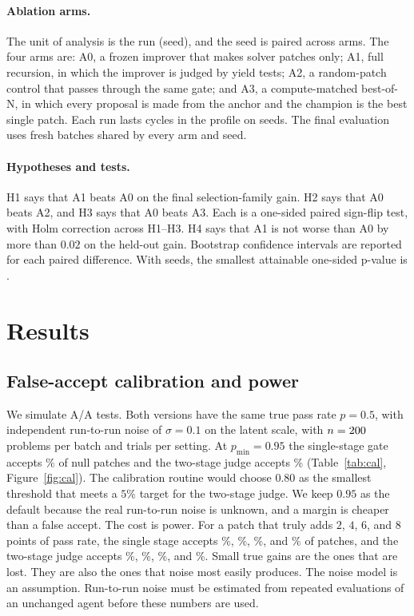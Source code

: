 \documentclass[11pt]{article}
\begin{document}
\paragraph{Ablation arms.} The unit of analysis is the run (seed), and the seed is paired across arms. The four arms are:
A0, a frozen improver that makes solver patches only;
A1, full recursion, in which the improver is judged by yield tests;
A2, a random-patch control that passes through the same gate;
and A3, a compute-matched best-of-N, in which every proposal is made from the anchor and the champion is the best single patch.
Each run lasts \NCycles{} cycles in the \AblProfile{} profile on \NSeeds{} seeds. The final evaluation uses fresh batches shared by every arm and seed.

\paragraph{Hypotheses and tests.} H1 says that A1 beats A0 on the final selection-family gain. H2 says that A0 beats A2, and H3 says that A0 beats A3. Each is a one-sided paired sign-flip test, with Holm correction across H1--H3.
H4 says that A1 is not worse than A0 by more than $0.02$ on the held-out gain. Bootstrap confidence intervals are reported for each paired difference. With \NSeeds{} seeds, the smallest attainable one-sided p-value is \MinP.

\section{Results}
\label{sec:results}

\subsection{False-accept calibration and power}
\label{sec:cal}

We simulate A/A tests. Both versions have the same true pass rate $p=0.5$, with independent run-to-run noise of $\sigma=0.1$ on the latent scale, with $n=200$ problems per batch and \CalTrials{} trials per setting.
At $p_{\min}=0.95$ the single-stage gate accepts \FASingle\% of null patches and the two-stage judge accepts \FATwo\% (Table~\ref{tab:cal}, Figure~\ref{fig:cal}).
The calibration routine would choose $0.80$ as the smallest threshold that meets a $5\%$ target for the two-stage judge. We keep $0.95$ as the default because the real run-to-run noise is unknown, and a margin is cheaper than a false accept. The cost is power. For a patch that truly adds $2$, $4$, $6$, and $8$ points of pass rate, the single stage accepts \PowSingleZeroTwo\%, \PowSingleZeroFour\%, \PowSingleZeroSix\%, and \PowSingleZeroEight\% of patches, and the two-stage judge accepts \PowTwoZeroTwo\%, \PowTwoZeroFour\%, \PowTwoZeroSix\%, and \PowTwoZeroEight\%.
Small true gains are the ones that are lost. They are also the ones that noise most easily produces. The noise model is an assumption. Run-to-run noise must be estimated from repeated evaluations of an unchanged agent before these numbers are used.
\end{document}
